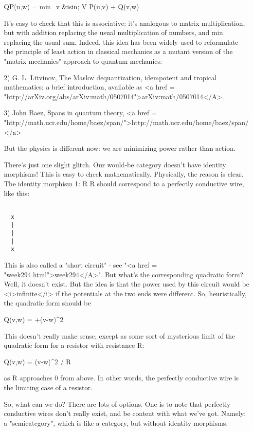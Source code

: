 QP(u,w) = min_{v &isin; V} P(u,v) + Q(v,w)

It's easy to check that this is associative: it's analogous to matrix
multiplication, but with addition replacing the usual multiplication
of numbers, and min replacing the usual sum.  Indeed, this idea has
been widely used to reformulate the principle of least action in
classical mechanics as a mutant version of the "matrix mechanics"
approach to quantum mechanics:

2) G. L. Litvinov, The Maslov dequantization, idempotent and tropical
mathematics: a brief introduction, available as <a href = "http://arXiv.org/abs/arXiv:math/0507014">arXiv:math/0507014</A>.

3) John Baez, Spans in quantum theory, <a href = "http://math.ucr.edu/home/baez/span/">http://math.ucr.edu/home/baez/span/</a>

But the physics is different now: we are minimizing power rather than
action.

There's just one slight glitch.  Our would-be category doesn't have
identity morphisms!  This is easy to check mathematically.  Physically, 
the reason is clear.  The identity morphism 1: R \to  R should correspond
to a perfectly conductive wire, like this:


\begin{verbatim}

  x  
  |  
  |  
  |  
  x  
\end{verbatim}
    

This is also called a "short circuit" - see "<a href =
"week294.html">week294</A>".  But what's the corresponding
quadratic form?  Well, it doesn't exist.  But the idea is that the
power used by this circuit would be <i>infinite</i> if the potentials at
the two ends were different.  So, heuristically, the quadratic form
should be

Q(v,w) = +\infty (v-w)^{2}

This doesn't really make sense, except as some sort of mysterious 
limit of the quadratic form for a resistor with resistance R:

Q(v,w) = (v-w)^{2} / R

as R approaches 0 from above.  In other words, the perfectly
conductive wire is the limiting case of a resistor.

So, what can we do?  There are lots of options.  One is to note that
perfectly conductive wires don't really exist, and be content with
what we've got.  Namely: a "semicategory", which is like a
category, but without identity morphisms.

